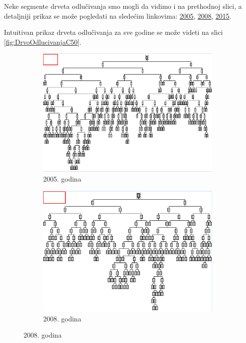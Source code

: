 \documentclass[a4paper]{article}
\begin{document}
Neke segmente drveta odlučivanja smo mogli da vidimo i na prethodnoj slici, a detaljniji prikaz se može pogledati na sledećim linkovima: \href{file:./Klasifikacija/C50/Model_Surface2005.html}{2005}, \href{file:./Klasifikacija/C50/Model_Surface2008.html}{2008}, \href{file:./Klasifikacija/C50/Model_Surface2015.html}{2015}. 

\restoregeometry
Intuitivan prikaz drveta odlučivanja za sve godine se može videti na slici \ref{fig:DrvoOdlucivanjaC50}.

\begin{figure}[H]
	\begin{subfigure}[h]{\textwidth}
		\begin{center}
			\includegraphics[scale=0.70]{Klasifikacija/C50/MapaDrvetaOdlucivanja2005.png}
		\end{center}
		\caption{2005. godina}
		\label{fig:DrvoOdlucivanjaC502005}
	\end{subfigure}

	\vspace{0.5cm}
	\begin{subfigure}[h]{\textwidth}
		\begin{center}
			\includegraphics[scale=0.70]{Klasifikacija/C50/MapaDrvetaOdlucivanja2008.png}
		\end{center}
		\caption{2008. godina}
		\label{fig:DrvoOdlucivanjaC502008}
	\end{subfigure}
	

\end{figure}
\end{document}
